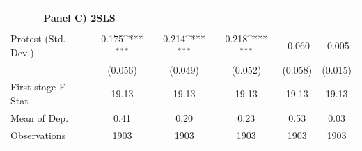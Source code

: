 {
\def\sym#1{\ifmmode^{#1}\else\(^{#1}\)\fi}
\begin{tabular}{l*{5}{c}}
\hline\hline
 \\ \multicolumn{2}{c}{\textbf{Panel C) 2SLS}} \\\\
Protest (Std. Dev.) &       0.175\sym{***}&       0.214\sym{***}&       0.218\sym{***}&      -0.060         &      -0.005         \\
                    &     (0.056)         &     (0.049)         &     (0.052)         &     (0.058)         &     (0.015)         \\
\hline
First-stage F-Stat  &       19.13         &       19.13         &       19.13         &       19.13         &       19.13         \\
Mean of Dep.        &        0.41         &        0.20         &        0.23         &        0.53         &        0.03         \\
Observations        &        1903         &        1903         &        1903         &        1903         &        1903         \\
\hline\hline
\end{tabular}
}
